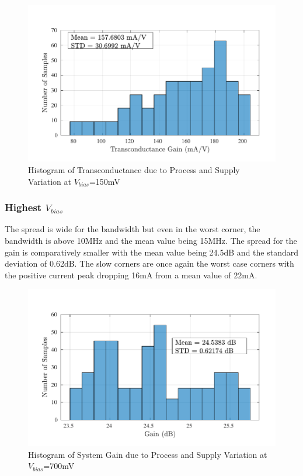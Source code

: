 \begin{figure} [H]
\centering
\includegraphics[scale=1]{Figures/Corners/Overall/PV_Min/PDFs/PV_Min_gm.pdf}
\caption{Histogram of Transconductance due to Process and Supply Variation at $V_{bias}$=150mV}
\end{figure}

\subsubsection{Highest $V_{bias}$}
The spread is wide for the bandwidth but even in the worst corner, the bandwidth is above 10MHz and the mean value being 15MHz. The spread for the gain is comparatively smaller with the mean value being 24.5dB and the standard deviation of 0.62dB. The slow corners are once again the worst case corners with the positive current peak dropping 16mA from a mean value of 22mA.
\begin{figure} [H]
\centering
\includegraphics[scale=1]{Figures/Corners/Overall/PV_Max/PDFs/PV_Max_gain.pdf}
\caption{Histogram of System Gain due to Process and Supply Variation at $V_{bias}$=700mV}
\end{figure}

